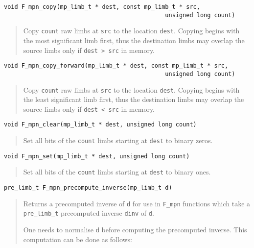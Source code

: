 \documentclass[a4paper,10pt]{article}
\newcommand{\code}{\lstinline}
\begin{document}
\begin{lstlisting}
void F_mpn_copy(mp_limb_t * dest, const mp_limb_t * src, 
                                              unsigned long count)
\end{lstlisting}
\begin{quote}
Copy \code{count} raw limbs at \code{src} to the location \code{dest}. Copying begins with the most significant limb first, thus the destination limbs may overlap the source limbs only if \code{dest > src} in memory.
\end{quote}

\begin{lstlisting}
void F_mpn_copy_forward(mp_limb_t * dest, const mp_limb_t * src,  
                                              unsigned long count)
\end{lstlisting}
\begin{quote}
Copy \code{count} raw limbs at \code{src} to the location \code{dest}. Copying begins with the least significant limb first, thus the destination limbs may overlap the source limbs only if \code{dest < src} in memory.
\end{quote}

\begin{lstlisting}
void F_mpn_clear(mp_limb_t * dest, unsigned long count)
\end{lstlisting}
\begin{quote}
Set all bits of the \code{count} limbs starting at \code{dest} to binary zeros.
\end{quote}

\begin{lstlisting}
void F_mpn_set(mp_limb_t * dest, unsigned long count)
\end{lstlisting}
\begin{quote}
Set all bits of the \code{count} limbs starting at \code{dest} to binary ones.
\end{quote}

\begin{lstlisting}
pre_limb_t F_mpn_precompute_inverse(mp_limb_t d)                  
\end{lstlisting}
\begin{quote}
Returns a precomputed inverse of \code{d} for use in \code{F_mpn} functions which take a \code{pre_limb_t} precomputed inverse \code{dinv} of \code{d}. 

One needs to normalise \code{d} before computing the precomputed inverse. This computation can be done as follows:
\end{quote}
\end{document}
